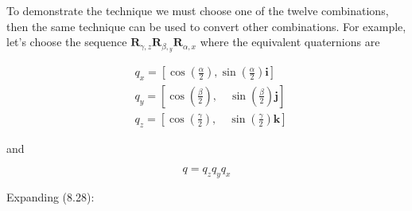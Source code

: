 \documentclass[10pt]{article}
\begin{document}
To demonstrate the technique we must choose one of the twelve combinations, then the same technique can be used to convert other combinations. For example, let's choose the sequence $\mathbf{R}_{\gamma, z} \mathbf{R}_{\beta,{ }_{y}} \mathbf{R}_{\alpha, x}$ where the equivalent quaternions are

$$
\begin{aligned}
& q_{x}=\left[\cos \left(\frac{\alpha}{2}\right), \sin \left(\frac{\alpha}{2}\right) \mathbf{i}\right] \\
& q_{y}=\left[\cos \left(\frac{\beta}{2}\right), \quad \sin \left(\frac{\beta}{2}\right) \mathbf{j}\right] \\
& q_{z}=\left[\cos \left(\frac{\gamma}{2}\right), \quad \sin \left(\frac{\gamma}{2}\right) \mathbf{k}\right]
\end{aligned}
$$

and

$$
q=q_{z} q_{y} q_{x}
$$

Expanding (8.28):
\end{document}

